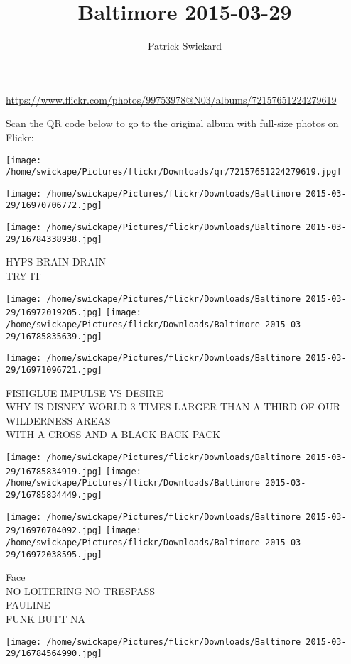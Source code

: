 \documentclass[10pt,letterpaper]{article}
\title{Baltimore 2015-03-29}
\author{Patrick Swickard}
\date{}
\begin{document}
\maketitle

\url{https://www.flickr.com/photos/99753978@N03/albums/72157651224279619}

Scan the QR code below to go to the original album with full-size photos on Flickr:

\texttt{[image: /home/swickape/Pictures/flickr/Downloads/qr/72157651224279619.jpg]}
\pagebreak

\texttt{[image: /home/swickape/Pictures/flickr/Downloads/Baltimore 2015-03-29/16970706772.jpg]}

\vspace{0.25in}
\texttt{[image: /home/swickape/Pictures/flickr/Downloads/Baltimore 2015-03-29/16784338938.jpg]}

HYPS BRAIN DRAIN\\
TRY IT
\pagebreak

\texttt{[image: /home/swickape/Pictures/flickr/Downloads/Baltimore 2015-03-29/16972019205.jpg]}
\texttt{[image: /home/swickape/Pictures/flickr/Downloads/Baltimore 2015-03-29/16785835639.jpg]}

\vspace{0.25in}
\texttt{[image: /home/swickape/Pictures/flickr/Downloads/Baltimore 2015-03-29/16971096721.jpg]}

FISHGLUE IMPULSE VS DESIRE\\
WHY IS DISNEY WORLD 3 TIMES LARGER THAN A THIRD OF OUR WILDERNESS AREAS\\
WITH A CROSS AND A BLACK BACK PACK
\pagebreak

\texttt{[image: /home/swickape/Pictures/flickr/Downloads/Baltimore 2015-03-29/16785834919.jpg]}
\texttt{[image: /home/swickape/Pictures/flickr/Downloads/Baltimore 2015-03-29/16785834449.jpg]}

\texttt{[image: /home/swickape/Pictures/flickr/Downloads/Baltimore 2015-03-29/16970704092.jpg]}
\texttt{[image: /home/swickape/Pictures/flickr/Downloads/Baltimore 2015-03-29/16972038595.jpg]}

Face\\
NO LOITERING NO TRESPASS\\
PAULINE\\
FUNK BUTT NA
\pagebreak

\texttt{[image: /home/swickape/Pictures/flickr/Downloads/Baltimore 2015-03-29/16784564990.jpg]}
\end{document}

